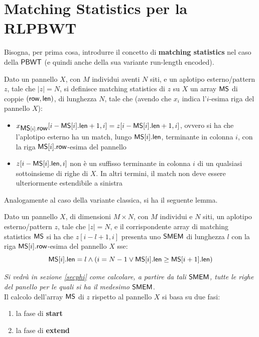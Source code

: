 \section{Matching Statistics per la RLPBWT}
Bisogna, per prima cosa, introdurre il 
concetto di \textbf{matching statistics} nel caso della $\mbox{\rm {\sf PBWT}}$ (e quindi
anche della sua variante run-length encoded).
\begin{definizione}
  Dato un pannello $X$, con $M$ individui aventi $N$ siti,
  e un aplotipo esterno/pattern $z$, tale che $|z|=N$, si definisce matching
  statistics di $z$ su $X$ un array $\mbox{\rm {\sf MS}}$ di coppie $(\mbox{\rm {\sf row}},\mbox{\rm {\sf len}})$, di lunghezza
  $N$, tale che (avendo che $x_i$ indica l'$i$-esima riga del pannello $X$): 
  \begin{itemize}
    \item $x_{\mbox{\rm {\sf MS}}[i].\mbox{\rm {\sf row}}}[i-\mbox{\rm {\sf MS}}[i].\mbox{\rm {\sf len}}+1,i]=z[i-\mbox{\rm {\sf MS}}[i].\mbox{\rm {\sf len}}+1,i]$, ovvero si
    ha che 
    l'aplotipo esterno ha un match, lungo $\mbox{\rm {\sf MS}}[i].\mbox{\rm {\sf len}}$, terminante in colonna
    $i$, con la riga 
    $\mbox{\rm {\sf MS}}[i].\mbox{\rm {\sf row}}$-esima del pannello
    \item $z[i-\mbox{\rm {\sf MS}}[i].\mbox{\rm {\sf len}},i]$ non è un suffisso terminante in colonna $i$ di un
    qualsiasi sottoinsieme di righe di $X$. In altri termini, il match non deve
    essere ulteriormente estendibile a sinistra
  \end{itemize}
\end{definizione}
\noindent
Analogamente al caso della variante classica, si ha il seguente lemma.
\begin{lemma}
  Dato un pannello $X$, di dimensioni $M\times N$, con $M$ individui e $N$
  siti, un aplotipo esterno/pattern $z$, tale che $|z|=N$, e il corrispondente
  array di matching statistics $\mbox{\rm {\sf MS}}$ si ha che $z[i-l+1,i]$
  presenta uno $\mbox{\rm {\sf SMEM}}$ di lunghezza $l$ con la riga $\mbox{\rm {\sf MS}}[i].\mbox{\rm {\sf row}}$-esima del
  pannello $X$ sse: 
  \begin{equation}
    \label{eq:rlpbwtsmem}
    \mbox{\rm {\sf MS}}[i].\mbox{\rm {\sf len}}=l\land(i=N-1\lor \mbox{\rm {\sf MS}}[i].\mbox{\rm {\sf len}}\geq \mbox{\rm {\sf MS}}[i+1].\mbox{\rm {\sf len}})
  \end{equation}
\end{lemma}
\noindent
\textit{Si vedrà in sezione \ref{secphi} come calcolare, a partire da tali
  $\mbox{\rm {\sf SMEM}}$, tutte le righe del panello per le quali si ha il medesimo
  $\mbox{\rm {\sf SMEM}}$}.\\
Il calcolo dell'array $\mbox{\rm {\sf MS}}$ di $z$ rispetto al pannello $X$ si basa su due fasi:
\begin{enumerate}
  \item la fase di \textbf{start}
  \item la fase di \textbf{extend}
\end{enumerate}
